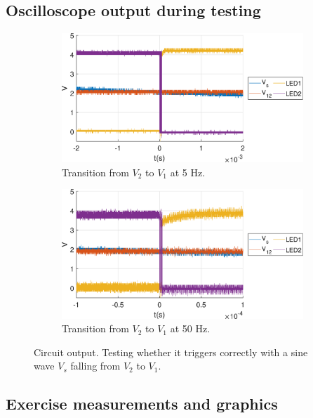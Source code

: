 \documentclass{article}
\begin{document}
\subsection{Oscilloscope output during testing}
\begin{figure}[H]
	\centering
	\begin{subfigure}{.5\linewidth}
		\centering
		\includegraphics[keepaspectratio,width=.98\linewidth]{5hz_all.eps}
		\caption{Transition from $V_2$ to $V_1$ at 5 Hz.}
	\end{subfigure}%
	\begin{subfigure}{.5\linewidth}
		\centering
		\includegraphics[keepaspectratio,width=.98\linewidth]{50hz_all.eps}
		\caption{Transition from $V_2$ to $V_1$ at 50 Hz.}
	\end{subfigure}
\caption{Circuit output. Testing whether it triggers correctly with a sine wave $V_s$ falling from $V_2$ to $V_1$.}
\end{figure}
\subsection{Exercise measurements and graphics}
\end{document}

